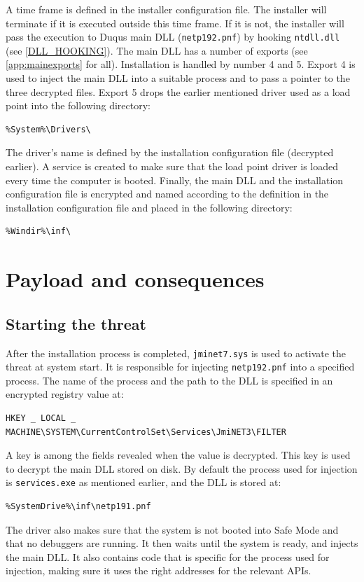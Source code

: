 \documentclass[11pt,english,a4paper]{report}
\begin{document}
A time frame is defined in the installer configuration file. The installer will terminate if it is executed outside this time frame. If it is not, the installer will pass the execution to Duqus main DLL (\texttt{netp192.pnf}) by hooking \texttt{ntdll.dll} (see \ref{DLL_HOOKING}). The main DLL has a number of exports (see \ref{app:mainexports} for all). Installation is handled by number 4 and 5. Export 4 is used to inject the main DLL into a suitable process and to pass a pointer to the three decrypted files. Export 5 drops the earlier mentioned driver used as a load point into the following directory:
\begin{lstlisting}
%System%\Drivers\ 
\end{lstlisting}
The driver's name is defined by the installation configuration file (decrypted earlier). A service is created to make sure that the load point driver is loaded every time the computer is booted. Finally, the main DLL and the installation configuration file is encrypted and named according to the definition in the installation configuration file and placed in the following directory:
\begin{lstlisting}
%Windir%\inf\ 
\end{lstlisting}

\chapter{Payload and consequences}
\section{Starting the threat}
After the installation process is completed, \texttt{jminet7.sys} is used to activate the threat at system start. It is responsible for injecting \texttt{netp192.pnf} into a specified process. The name of the process and the path to the DLL is specified in an encrypted registry value at:
\begin{lstlisting}
HKEY _ LOCAL _ MACHINE\SYSTEM\CurrentControlSet\Services\JmiNET3\FILTER
\end{lstlisting}
A key is among the fields revealed when the value is decrypted. This key is used to decrypt the main DLL stored on disk. By default the process used for injection is \texttt{services.exe} as mentioned earlier, and the DLL is stored at:
\begin{lstlisting}
%SystemDrive%\inf\netp191.pnf 
\end{lstlisting}
The driver also makes sure that the system is not booted into Safe Mode and that no debuggers are running. It then waits until the system is ready, and injects the main DLL. It also contains code that is specific for the process used for injection, making sure it uses the right addresses for the relevant APIs.
\end{document}

